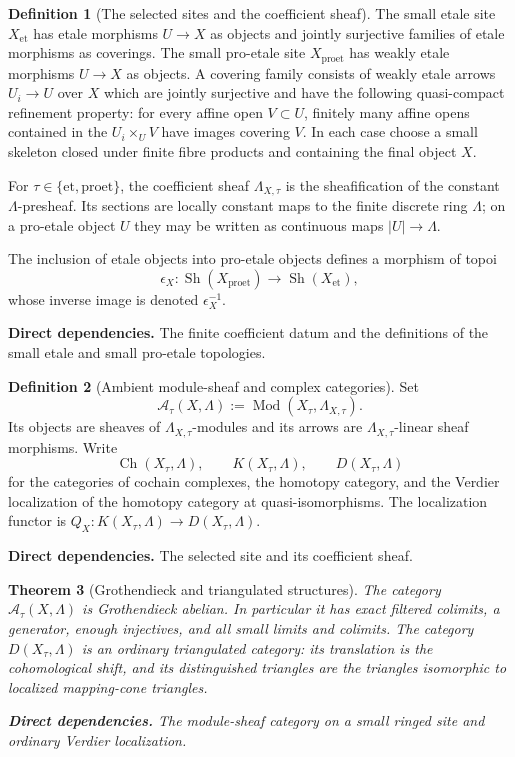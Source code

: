 \documentclass[10pt]{article}
\newtheorem{theorem}{Theorem}[section]
\theoremstyle{definition}
\newtheorem{definition}[theorem]{Definition}
\newcommand{\Mod}{\operatorname{Mod}}
\newcommand{\Sh}{\operatorname{Sh}}
\newcommand{\deps}[1]{\par\smallskip\noindent\textbf{Direct dependencies.} #1}
\begin{document}
\begin{definition}[The selected sites and the coefficient sheaf]
The small etale site $X_{\mathrm{et}}$ has etale morphisms $U\to X$ as
objects and jointly surjective families of etale morphisms as coverings.
The small pro-etale site $X_{\mathrm{proet}}$ has weakly etale morphisms
$U\to X$ as objects.  A covering family consists of weakly etale arrows
$U_i\to U$ over $X$ which are jointly surjective and have the following
quasi-compact refinement property: for every affine open $V\subset U$,
finitely many affine opens contained in the $U_i\times_UV$ have images
covering $V$.  In each case choose
a small skeleton closed under finite fibre products and containing the final
object $X$.

For $\tau\in\{\mathrm{et},\mathrm{proet}\}$, the coefficient sheaf
$\Lambda_{X,\tau}$ is the sheafification of the constant
$\Lambda$-presheaf.  Its sections are locally constant maps to the finite
discrete ring $\Lambda$; on a pro-etale object $U$ they may be written as
continuous maps $|U|\to\Lambda$.

The inclusion of etale objects into pro-etale objects defines a morphism of
topoi
\[
 \epsilon_X:\Sh(X_{\mathrm{proet}})\longrightarrow
             \Sh(X_{\mathrm{et}}),
\]
whose inverse image is denoted $\epsilon_X^{-1}$.
\deps{The finite coefficient datum and the definitions of the small etale
and small pro-etale topologies.}
\end{definition}

\begin{definition}[Ambient module-sheaf and complex categories]
Set
\[
 \mathcal A_\tau(X,\Lambda)
   :=\Mod(X_\tau,\Lambda_{X,\tau}).
\]
Its objects are sheaves of $\Lambda_{X,\tau}$-modules and its arrows are
$\Lambda_{X,\tau}$-linear sheaf morphisms.  Write
\[
 \operatorname{Ch}(X_\tau,\Lambda),\qquad
 K(X_\tau,\Lambda),\qquad
 D(X_\tau,\Lambda)
\]
for the categories of cochain complexes, the homotopy category, and the
Verdier localization of the homotopy category at quasi-isomorphisms.  The
localization functor is $Q_X:K(X_\tau,\Lambda)\to D(X_\tau,\Lambda)$.
\deps{The selected site and its coefficient sheaf.}
\end{definition}

\begin{theorem}[Grothendieck and triangulated structures]
The category $\mathcal A_\tau(X,\Lambda)$ is Grothendieck abelian.  In
particular it has exact filtered colimits, a generator, enough injectives,
and all small limits and colimits.  The category $D(X_\tau,\Lambda)$ is an
ordinary triangulated category: its translation is the cohomological shift,
and its distinguished triangles are the triangles isomorphic to localized
mapping-cone triangles.
\deps{The module-sheaf category on a small ringed site and ordinary Verdier
localization.}
\end{theorem}
\end{document}
